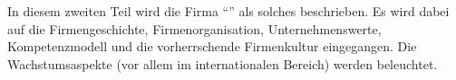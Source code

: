 \begin{sloppypar}
In diesem zweiten Teil wird die Firma "`\company"' als solches beschrieben. Es wird dabei auf die Firmengeschichte, Firmenorganisation, Unternehmenswerte, Kompetenzmodell und die vorherrschende Firmenkultur eingegangen. Die Wachstumsaspekte (vor allem im internationalen Bereich) werden beleuchtet.
\end{sloppypar}
